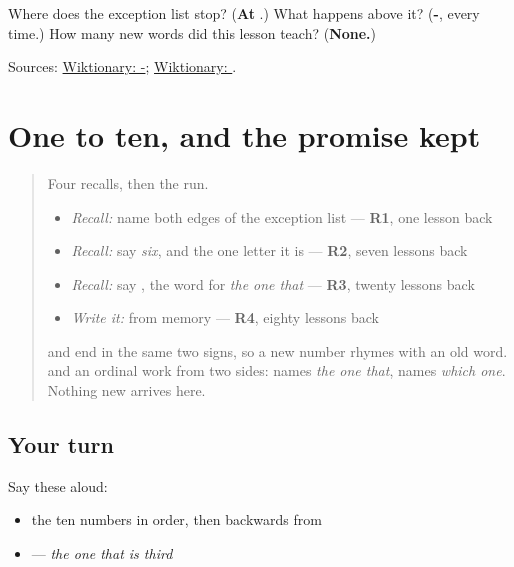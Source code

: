 \begin{tcolorbox}[breakable,colback=teal!4,colframe=teal!35!black,title={Before you move on}]
Where does the exception list stop? (\textbf{At }.) What happens above it? (\textbf{-}, every time.) How many new words did this lesson teach? (\textbf{None.})

Sources: \href{https://en.wiktionary.org/wiki/-\%E0\%AA\%AE\%E0\%AB\%81\%E0\%AA\%82}{Wiktionary: -}; \href{https://en.wiktionary.org/wiki/\%E0\%AA\%9B}{Wiktionary: }.
\end{tcolorbox}
\section[Practice]{One to ten, and the promise kept}

\label{lesson:GU-R39-one-to-ten}



\begin{quote}
Four recalls, then the run.

\begin{itemize}
\raggedright
  \item \emph{Recall:} name both edges of the exception list — \textbf{R1}, one lesson back
  \item \emph{Recall:} say \emph{six}, and the one letter it is — \textbf{R2}, seven lessons back
  \item \emph{Recall:} say \textbf{}, the word for \emph{the one that} — \textbf{R3}, twenty lessons back
  \item \emph{Write it:} \textbf{} from memory — \textbf{R4}, eighty lessons back
\end{itemize}

\textbf{} and \textbf{} end in the same two signs, so a new number rhymes with an old word. \textbf{} and an ordinal work from two sides: \textbf{} names \emph{the one that}, \textbf{} names \emph{which one}. Nothing new arrives here.
\end{quote}

\subsection*{Your turn}
Say these aloud:

\begin{itemize}
\raggedright
  \item the ten numbers in order, then backwards from \textbf{}
  \item \textbf{} \textbf{}  — \emph{the one that is third}
\end{itemize}

